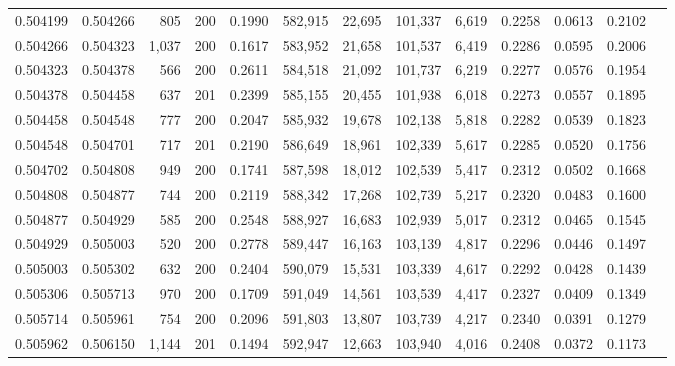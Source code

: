 \begin{tabular}{rrrrrrrrrrrrr}
0.504199 & 0.504266 &   805 & 200 &                                     0.1990 & 582,915 &  22,695 & 101,337 &   6,619 & 0.2258 & 0.0613 & 0.2102 \\
0.504266 & 0.504323 & 1,037 & 200 &                                     0.1617 & 583,952 &  21,658 & 101,537 &   6,419 & 0.2286 & 0.0595 & 0.2006 \\
0.504323 & 0.504378 &   566 & 200 &                                     0.2611 & 584,518 &  21,092 & 101,737 &   6,219 & 0.2277 & 0.0576 & 0.1954 \\
0.504378 & 0.504458 &   637 & 201 &                                     0.2399 & 585,155 &  20,455 & 101,938 &   6,018 & 0.2273 & 0.0557 & 0.1895 \\
0.504458 & 0.504548 &   777 & 200 &                                     0.2047 & 585,932 &  19,678 & 102,138 &   5,818 & 0.2282 & 0.0539 & 0.1823 \\
0.504548 & 0.504701 &   717 & 201 &                                     0.2190 & 586,649 &  18,961 & 102,339 &   5,617 & 0.2285 & 0.0520 & 0.1756 \\
0.504702 & 0.504808 &   949 & 200 &                                     0.1741 & 587,598 &  18,012 & 102,539 &   5,417 & 0.2312 & 0.0502 & 0.1668 \\
0.504808 & 0.504877 &   744 & 200 &                                     0.2119 & 588,342 &  17,268 & 102,739 &   5,217 & 0.2320 & 0.0483 & 0.1600 \\
0.504877 & 0.504929 &   585 & 200 &                                     0.2548 & 588,927 &  16,683 & 102,939 &   5,017 & 0.2312 & 0.0465 & 0.1545 \\
0.504929 & 0.505003 &   520 & 200 &                                     0.2778 & 589,447 &  16,163 & 103,139 &   4,817 & 0.2296 & 0.0446 & 0.1497 \\
0.505003 & 0.505302 &   632 & 200 &                                     0.2404 & 590,079 &  15,531 & 103,339 &   4,617 & 0.2292 & 0.0428 & 0.1439 \\
0.505306 & 0.505713 &   970 & 200 &                                     0.1709 & 591,049 &  14,561 & 103,539 &   4,417 & 0.2327 & 0.0409 & 0.1349 \\
0.505714 & 0.505961 &   754 & 200 &                                     0.2096 & 591,803 &  13,807 & 103,739 &   4,217 & 0.2340 & 0.0391 & 0.1279 \\
0.505962 & 0.506150 & 1,144 & 201 &                                     0.1494 & 592,947 &  12,663 & 103,940 &   4,016 & 0.2408 & 0.0372 & 0.1173 \\

\end{tabular}
